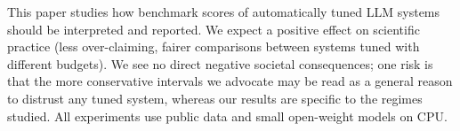 This paper studies how benchmark scores of automatically tuned LLM systems should be interpreted and reported. We expect a positive effect on scientific practice (less over-claiming, fairer comparisons between systems tuned with different budgets). We see no direct negative societal consequences; one risk is that the more conservative intervals we advocate may be read as a general reason to distrust any tuned system, whereas our results are specific to the regimes studied. All experiments use public data and small open-weight models on CPU.
